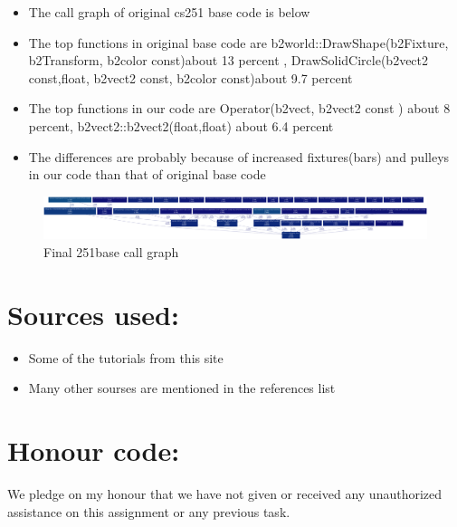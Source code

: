\documentclass[10pt,a4paper]{article}
\begin{document}
   \begin{itemize}
   \item The call graph of original cs251 base code is below
   \item The top functions in original base code are
   b2world::DrawShape(b2Fixture, b2Transform, b2color const)about 13 percent ,
   DrawSolidCircle(b2vect2 const,float, b2vect2 const, b2color const)about 9.7
   percent
   \item The top functions in  our code are Operator(b2vect, b2vect2 const )
   about 8 percent, b2vect2::b2vect2(float,float) about 6.4 percent
   \item The differences are probably because of increased fixtures(bars) and
   pulleys in our code than that of original base code
   \end{itemize}
   
 \begin{figure}[!htb]
 \begin{centering}
 \includegraphics[width=1.0\textwidth]{final251base.png}
 \end{centering}
 \caption{Final 251base call graph}
 \end{figure}
 \vspace{-10pt}
   
\section*{\textbf{Sources used:}}
 \begin{itemize}[itemsep = -0.75 mm, leftmargin=*]
  \item Some of the tutorials from this site \cite{boxtut}
  \item Many other sourses are mentioned in the references list
 \end{itemize}
\section*{\textbf{Honour code:}}
We pledge on my honour that we have not given or received any unauthorized
assistance on this    assignment or any previous task.
  
  
\end{document}

